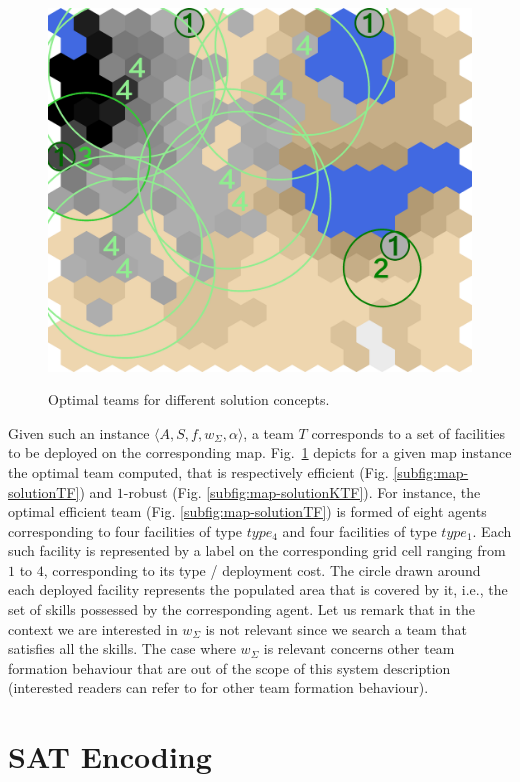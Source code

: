 \documentclass[conference]{IEEEtran}
\theoremstyle{definition}
\begin{document}
\begin{figure}[tp]
{		\label{subfig:map-solutionKTF}
		\includegraphics[width=\widthmap\textwidth]{TF-1-KTF-k1}
	}
	\caption{Optimal teams for different solution concepts.}
	\label{fig:map-solution}
\end{figure}


Given such an instance $\langle A, S, f, w_\Sigma, \alpha\rangle$, a team $T$ 
corresponds to a set of facilities to be deployed on the corresponding map.
Fig.~\ref{fig:map-solution} depicts for a given map instance the optimal team computed, that is
respectively efficient (Fig. \ref{subfig:map-solutionTF}) and $1$-robust (Fig. \ref{subfig:map-solutionKTF}).
For instance, the optimal efficient team (Fig. \ref{subfig:map-solutionTF}) 
is formed of eight agents corresponding to four facilities
of type $type_4$ and four facilities of type $type_1$. Each such facility 
is represented by a label on the corresponding grid cell
ranging from $1$ to $4$, corresponding to its type / deployment cost. 
The circle drawn around each deployed facility represents the populated area
that is covered by it, i.e., the set of skills possessed by the corresponding agent.
Let us remark that in the context we are interested in $w_\Sigma$ is not relevant since
we search a team that satisfies all the skills. The case where $w_\Sigma$ is relevant 
concerns other team formation behaviour that are out of the scope of this system description
(interested readers can refer to \cite{schwind2021} for other team formation behaviour).

\section{SAT Encoding}
\end{document}

